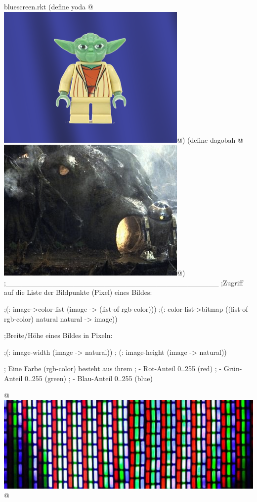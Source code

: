 \begin{filecontents*}{bluescreen.rkt}
(define yoda @\includegraphics[scale=0.5]{Yoda}@)
(define dagobah @\includegraphics[scale =0.5]{dagobah}@)
;_________________________________________
;Zugriff auf die Liste der Bildpunkte (Pixel) eines Bildes: 
 
;(: image->color-list (image -> (list-of rgb-color)))  
;(: color-list->bitmap ((list-of rgb-color) natural natural -> image))
 
;Breite/Höhe eines Bildes in Pixeln:
 
;(: image-width (image -> natural))
; (: image-height (image -> natural))
 
; Eine Farbe (rgb-color) besteht aus ihrem
; - Rot-Anteil 0..255 (red)
; - Grün-Anteil 0..255 (green)
; - Blau-Anteil 0..255 (blue)

 @\includegraphics[scale=0.5]{pixel}@
 

\end{filecontents*}
